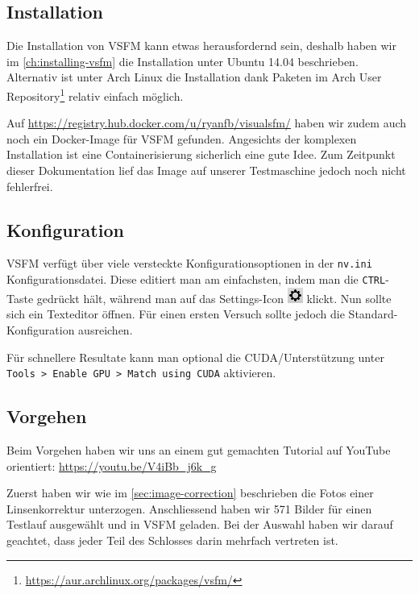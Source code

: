 \subsection{Installation}

Die Installation von VSFM kann etwas herausfordernd sein, deshalb haben wir im
\autoref{ch:installing-vsfm} die Installation unter Ubuntu 14.04 beschrieben.
Alternativ ist unter Arch Linux die Installation dank Paketen im Arch User
Repository\footnote{\url{https://aur.archlinux.org/packages/vsfm/}} relativ
einfach möglich.

Auf \url{https://registry.hub.docker.com/u/ryanfb/visualsfm/} haben wir zudem
auch noch ein Docker-Image für VSFM gefunden. Angesichts der komplexen
Installation ist eine Containerisierung sicherlich eine gute Idee. Zum Zeitpunkt
dieser Dokumentation lief das Image auf unserer Testmaschine jedoch noch nicht
fehlerfrei.

\subsection{Konfiguration}

VSFM verfügt über viele versteckte Konfigurationsoptionen in der \texttt{nv.ini}
Konfigurationsdatei. Diese editiert man am einfachsten, indem man die
\texttt{CTRL}-Taste gedrückt hält, während man auf das Settings-Icon
\includegraphics[scale=0.75]{images/vsfm_icon_settings} klickt. Nun sollte sich
ein Texteditor öffnen. Für einen ersten Versuch sollte jedoch die
Standard-Konfiguration ausreichen.

Für schnellere Resultate kann man optional die CUDA\-/Unterstützung unter
\texttt{Tools > Enable GPU > Match using CUDA} aktivieren.

\subsection{Vorgehen}

Beim Vorgehen haben wir uns an einem gut gemachten Tutorial auf YouTube
orientiert: \url{https://youtu.be/V4iBb_j6k_g}

Zuerst haben wir wie im \autoref{sec:image-correction} beschrieben die Fotos
einer Linsenkorrektur unterzogen. Anschliessend haben wir 571 Bilder für einen
Testlauf ausgewählt und in VSFM geladen. Bei der Auswahl haben wir darauf
geachtet, dass jeder Teil des Schlosses darin mehrfach vertreten ist.

